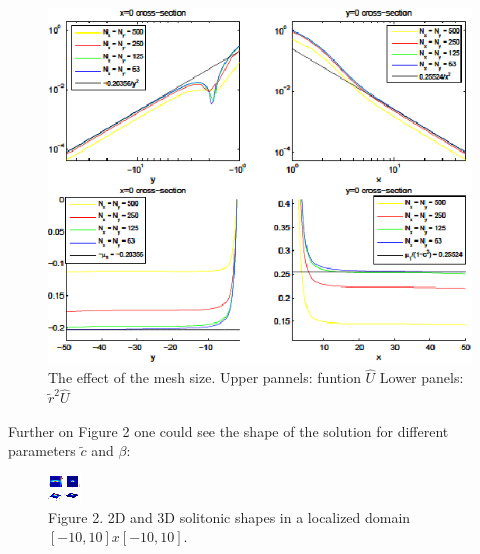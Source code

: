 \documentclass[12pt]{article}
\theoremstyle{theorem}
\theoremstyle{defi}
\begin{document}
\begin{figure}[htbp]
        \centering
              \includegraphics[width=0.98\linewidth]{figure1.eps}   
        \caption{The effect of the mesh size. Upper pannels: funtion $\widehat{U}$  Lower panels: $\tilde r^2 \widehat{U}$  }
	\label{fig1}
\end{figure}

Further on Figure 2 one could see the shape of the solution for different parameters $\tilde c$ and $\beta$:
 
\begin{figure}[htbp]
        \centering
              \includegraphics[width=0.98\linewidth]{figure2.eps}   
        \caption{Figure 2. 2D and 3D solitonic shapes in a localized domain  $[-10, 10] x [-10, 10]$.}
	\label{fig1}
\end{figure}
\end{document}
